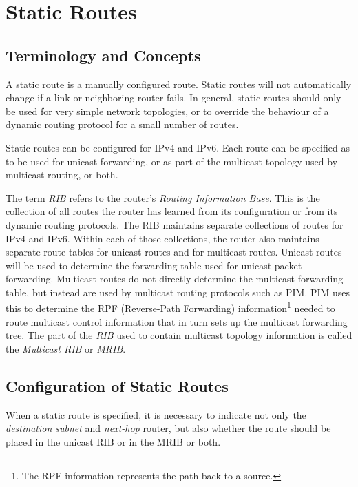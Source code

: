 %
%

\chapter{Static Routes}
\label{static_routes}
\section{Terminology and Concepts}

A static route is a manually configured route.  Static routes will not
automatically change if a link or neighboring router fails.  In
general, static routes should only be used for very simple network
topologies, or to override the behaviour of a dynamic routing protocol
for a small number of routes.

Static routes can be configured for IPv4 and IPv6.  Each route can be
specified as to be used for unicast forwarding, or as part of the
multicast topology used by multicast routing, or both.  

The term {\it RIB} refers to the router's {\it Routing Information
Base}.  This is the collection of all routes the router has learned
from its configuration or from its dynamic routing protocols.  The RIB
maintains separate collections of routes for IPv4 and IPv6.  Within
each of those collections, the router also maintains separate route
tables for unicast routes and for multicast routes.  Unicast routes
will be used to determine the forwarding table used for unicast packet
forwarding.  Multicast routes do not directly determine the multicast
forwarding table, but instead are used by multicast routing protocols
such as PIM.  PIM uses this to determine the RPF (Reverse-Path
Forwarding) information\footnote{The RPF information represents the path back
to a source.} needed to route 
multicast control information that in turn sets up the multicast
forwarding tree.  The part of the {\it RIB} used to contain multicast
topology information is called the {\it Multicast RIB} or {\it MRIB}.

\newpage
\section{Configuration of Static Routes}

When a static route is specified, it is necessary to indicate not only
the {\it destination subnet} and {\it next-hop} router, but also
whether the route should be placed in the unicast RIB or in the MRIB
or both.

